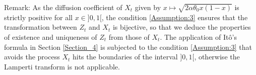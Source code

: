 \documentclass[11pt]{article}
\theoremstyle{definition}
\begin{document}
Remark: As the diffusion coefficient of $X_t$  given by  $x \mapsto \sqrt{2 \alpha \theta_0 x(1-x)}$  is strictly positive for all $x \in  ]0,1[$, the condition \eqref{Assumption:3}  ensures that the transformation between $Z_t$ and $X_t$ is bijective, so that we deduce the properties of existence and uniqueness of $Z_t$ from those of $X_t$. The application of  It\^{o}'s formula in Section \ref{Section_4} is subjected to the condition \eqref{Assumption:3} that avoids the process $X_t$ hits the boundaries of the interval $ ]0,1[$, otherwise the Lamperti transform is not applicable.



\nocite{*}
 
\printbibliography[title={References}]
\end{document}
